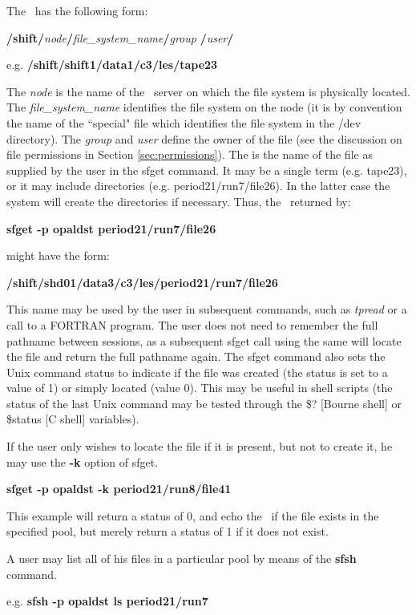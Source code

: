 The \nfspn\ has the following form:
 
{\bf /shift/}{\it node}{\bf /}{\it file\_system\_name}{\bf /}{\it group}{\bf
 /}{\it user}{\bf /}{\it \usppn}
 
e.g. {\bf /shift/shift1/data1/c3/les/tape23}
 
The {\it node} is the name of the \shift\ server on which the file system
is physically located. The {\it file\_system\_name} identifies the
file system on the node (it is by convention the name of the ``special" file
which identifies the file system in the /dev directory).
The {\it group} and {\it user} define the owner of the file (see the discussion
on file permissions in Section \ref{sec:permissions}). The {\it \usppn} is the
 name of the file as supplied
by the user in the sfget command. It may be a single term (e.g. tape23),
or it may include directories (e.g. period21/run7/file26). In the latter
case the system will create the directories if necessary. Thus, the \nfspn\
returned by:
 
{\bf sfget -p opaldst period21/run7/file26}
 
might have the form:
 
{\bf /shift/shd01/data3/c3/les/period21/run7/file26}
 
This name may be used by the user in subsequent commands, such as
{\it tpread} or a call to a FORTRAN program. The user does not need to
remember the full pathname between sessions, as a
subsequent sfget call using the same {\it \usppn}
will locate the file and return the full pathname again.
The sfget command also sets the Unix command status to indicate if the file was
created (the status is set to a value of 1) or simply located (value 0). This
may be useful in shell scripts (the status of the last Unix command may be
tested through the \$? [Bourne shell] or \$status [C shell] variables).
 
If the user only wishes to locate the file if it is present, but not to
create it, he may use the {\bf -k} option of sfget.
 
{\bf sfget -p opaldst -k period21/run8/file41}
 
This example will return a status of 0, and echo the \nfspn\ if the file exists
in the specified pool, but merely return a status of 1 if it does not exist.
 
 
A user may list all of his files in a particular pool by means of the {\bf sfsh}
command.
 
e.g. {\bf sfsh -p opaldst ls period21/run7}
 
